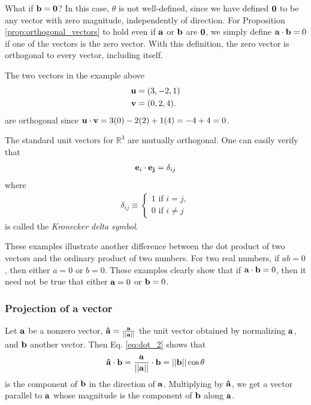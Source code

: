 \documentclass[12pt,letterpaper,reqno]{article}
\numberwithin{equation}{section}
\newcommand{\ti}[1]{\textit{#1}}
\begin{document}
What if ${\bf b}={\bf 0}$? In this case, $\theta$ is not well-defined, since we have defined ${\bf 0}$ to be any vector with zero magnitude, independently of direction. For Proposition \ref{prop:orthogonal_vectors} to hold even if ${\bf a}$ or ${\bf b}$ are ${\bf 0}$, we simply define ${\bf a}\cdot {\bf b}=0$ if one of the vectors is the zero vector. With this definition, the zero vector is orthogonal to every vector, including itself.

\begin{example}
The two vectors in the example above	
\begin{align*}
	{\bf u}&=(3,-2,1) \\
	{\bf v}&=(0,2,4).
\end{align*}
are orthogonal since ${\bf u}\cdot {\bf v}=3(0)-2(2)+1(4)=-4+4=0$.
\end{example}

\begin{example}
	The standard unit vectors for $\mathbb{R}^3$ are mutually orthogonal. One can easily verify that 
	\begin{align*}
		{\bf e}_i \cdot {\bf e_j}=\delta_{ij}
	\end{align*}
where 
\begin{align*}
	\delta_{ij} \equiv \begin{cases}
		1 \text{ if } i=j, \\
		0 \text{ if } i \neq j
	\end{cases}
\end{align*}
is called the \ti{Kronecker delta symbol}.
\end{example}

These examples illustrate another difference between the dot product of two vectors and the ordinary product of two numbers. For two real numbers, if $ab=0$, then either $a=0$ or $b=0$. These examples clearly show that if ${\bf a}\cdot {\bf b}=0$, then it need not be true that either ${\bf a}=0$ or ${\bf b}=0$.
\subsubsection{Projection of a vector}
Let ${\bf a}$ be a nonzero vector, ${\bf \hat{a}}=\frac{{\bf a}}{||{\bf a}||}$ the unit vector obtained by normalizing ${\bf a}$, and ${\bf b}$ another vector. Then Eq. \eqref{eq:dot_2} shows that
\begin{align*}
	{\bf \hat{a}}\cdot {\bf b}=\frac{{\bf a}}{||{\bf a}||} \cdot {\bf b}=||{\bf b}||\cos \theta
\end{align*} 
is the component of ${\bf b}$ in the direction of ${\bf a}$. Multiplying by ${\bf \hat{a}}$, we get a vector parallel to ${\bf a}$ whose magnitude is the component of ${\bf b}$ along ${\bf a}$.
\end{document}
